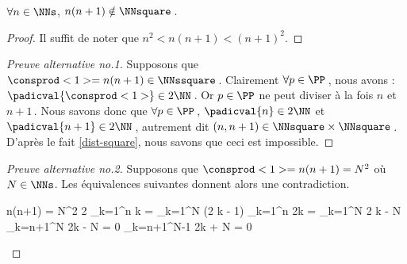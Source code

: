 \begin{fact} \label{case-2}
	 $\forall n \in \NNs$, $n(n+1) \notin \NNsquare$\,.
\end{fact}




\begin{proof}
	Il suffit de noter que $n^2 < n(n+1) < (n+1)^2$.
\end{proof}




\begin{proof}[Preuve alternative no.1]
    Supposons que $\consprod<1> = n(n+1) \in \NNssquare$\,.
    Clairement $\forall p \in \PP$\,, nous avons : $\padicval{\consprod<1>} \in 2 \NN$\,.
    Or $p \in \PP$ ne peut diviser à la fois $n$ et $n+1$\,.
    Nous savons donc que $\forall p \in \PP$\,, 
    $\padicval{n} \in 2 \NN$ et $\padicval{n+1} \in 2 \NN$\,,
    autrement dit 
    $(n, n + 1) \in \NNsquare \times \NNsquare$\,.
    D'après le fait \ref{dist-square}, nous savons que ceci est impossible.
\end{proof}




\begin{proof}[Preuve alternative no.2]
     Supposons que $\consprod<1> = n(n+1) = N^2$ où $N \in \NNs$.
     Les équivalences suivantes donnent alors une contradiction.
	
	\medskip
	
	\begin{stepcalc}[style = ar*, ope = \iff]
		n(n+1) = N^2
		2 \dsum_{k=1}^{n} k = \dsum_{k=1}^{N} (2 k - 1)
	\explnext{}
		\dsum_{k=1}^{n} 2k = \dsum_{k=1}^{N} 2 k - N
		\dsum_{k=n+1}^{N} 2k - N = 0
		\dsum_{k=n+1}^{N-1} 2k + N = 0
	\end{stepcalc}

	\vspace{-2ex}	
	\leavevmode
\end{proof}
